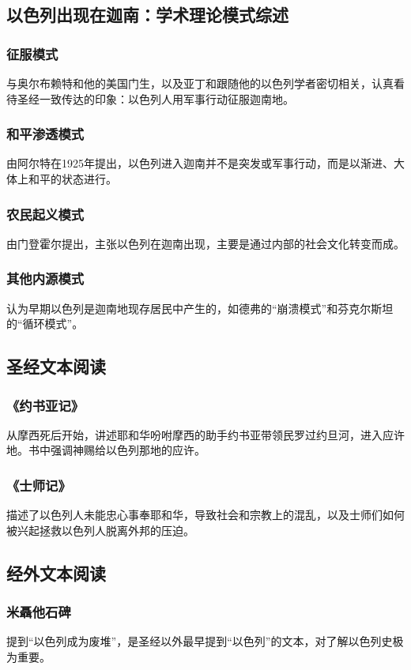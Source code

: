 \documentclass[12pt, a4paper]{ctexart}
\begin{document}
\subsection{以色列出现在迦南：学术理论模式综述}
\subsubsection{征服模式}
与奥尔布赖特和他的美国门生，以及亚丁和跟随他的以色列学者密切相关，认真看待圣经一致传达的印象：以色列人用军事行动征服迦南地。
\subsubsection{和平渗透模式}
由阿尔特在1925年提出，以色列进入迦南并不是突发或军事行动，而是以渐进、大体上和平的状态进行。
\subsubsection{农民起义模式}
由门登霍尔提出，主张以色列在迦南出现，主要是通过内部的社会文化转变而成。
\subsubsection{其他内源模式}
认为早期以色列是迦南地现存居民中产生的，如德弗的“崩溃模式”和芬克尔斯坦的“循环模式”。

\subsection{圣经文本阅读}
\subsubsection{《约书亚记》}
从摩西死后开始，讲述耶和华吩咐摩西的助手约书亚带领民罗过约旦河，进入应许地。书中强调神赐给以色列那地的应许。
\subsubsection{《士师记》}
描述了以色列人未能忠心事奉耶和华，导致社会和宗教上的混乱，以及士师们如何被兴起拯救以色列人脱离外邦的压迫。

\subsection{经外文本阅读}
\subsubsection{米聶他石碑}
提到“以色列成为废堆”，是圣经以外最早提到“以色列”的文本，对了解以色列史极为重要。
\end{document}
